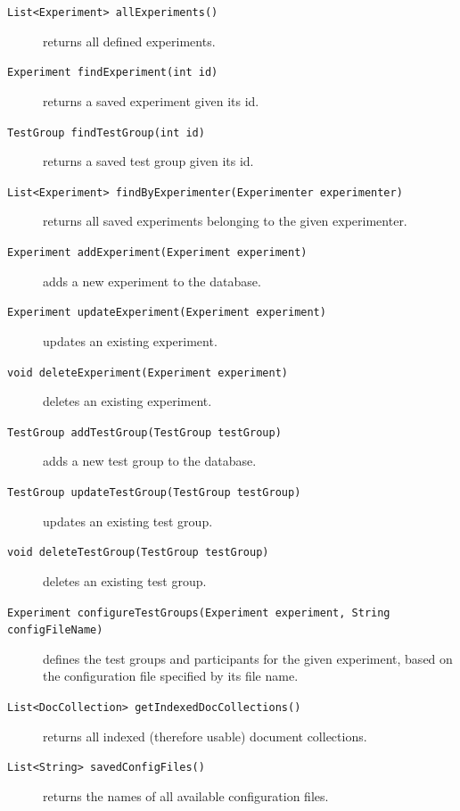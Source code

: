 \documentclass[a4paper]{usiinfbachelorproject}
\begin{document}
    \begin{description}

        \item[\texttt{List<Experiment> allExperiments()}] returns all defined experiments.

        \item[\texttt{Experiment findExperiment(int id)}] returns a saved experiment given its id.

        \item[\texttt{TestGroup findTestGroup(int id)}] returns a saved test group given its id.

        \item[\texttt{List<Experiment> findByExperimenter(Experimenter experimenter)}] returns all saved
            experiments belonging to the given experimenter.

        \item[\texttt{Experiment addExperiment(Experiment experiment)}] adds a new experiment to the database.

        \item[\texttt{Experiment updateExperiment(Experiment experiment)}] updates an existing experiment.

        \item[\texttt{void deleteExperiment(Experiment experiment)}] deletes an existing experiment.

        \item[\texttt{TestGroup addTestGroup(TestGroup testGroup)}] adds a new test group to the database.

        \item[\texttt{TestGroup updateTestGroup(TestGroup testGroup)}] updates an existing test group.

        \item[\texttt{void deleteTestGroup(TestGroup testGroup)}] deletes an existing test group.

        \item[\texttt{Experiment configureTestGroups(Experiment experiment, String configFileName)}] 
            defines the test groups and participants for the given experiment, based on the configuration file specified by its file name.

        \item[\texttt{List<DocCollection> getIndexedDocCollections()}] returns all indexed (therefore usable) document collections.

        \item[\texttt{List<String> savedConfigFiles()}] returns the names of all available configuration files.


\end{description}
\end{document}
